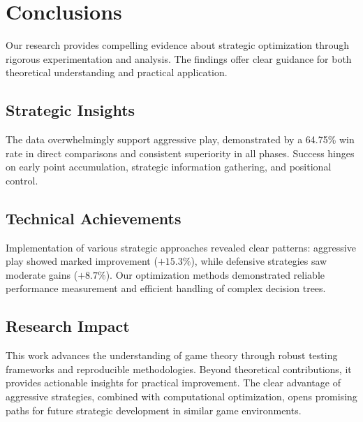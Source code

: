 \documentclass[runningheads]{llncs}
\begin{document}
\section{Conclusions}

Our research provides compelling evidence about strategic optimization through rigorous experimentation and analysis. The findings offer clear guidance for both theoretical understanding and practical application.

\subsection{Strategic Insights}
The data overwhelmingly support aggressive play, demonstrated by a 64.75\% win rate in direct comparisons and consistent superiority in all phases. Success hinges on early point accumulation, strategic information gathering, and positional control.

\subsection{Technical Achievements}
Implementation of various strategic approaches revealed clear patterns: aggressive play showed marked improvement (\(+15.3\%\)), while defensive strategies saw moderate gains (\(+8.7\%\)). Our optimization methods demonstrated reliable performance measurement and efficient handling of complex decision trees.

\subsection{Research Impact}
This work advances the understanding of game theory \cite{ref_eval_functions} through robust testing frameworks and reproducible methodologies. Beyond theoretical contributions, it provides actionable insights for practical improvement. The clear advantage of aggressive strategies, combined with computational optimization, opens promising paths for future strategic development in similar game environments.



%
%
%
% 
% 
%
\end{document}
